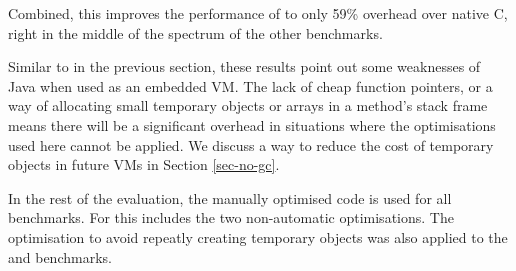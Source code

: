 Combined, this improves the performance of  to only 59\% overhead over native C, right in the middle of the spectrum of the other benchmarks.

Similar to  in the previous section, these results point out some weaknesses of Java when used as an embedded VM. The lack of cheap function pointers, or a way of allocating small temporary objects or arrays in a method's stack frame means there will be a significant overhead in situations where the optimisations used here cannot be applied. We discuss a way to reduce the cost of temporary objects in future VMs in Section \ref{sec-no-gc}.

In the rest of the evaluation, the manually optimised code is used for all benchmarks. For  this includes the two non-automatic optimisations. The optimisation to avoid repeatly creating temporary objects was also applied to the  and  benchmarks.
